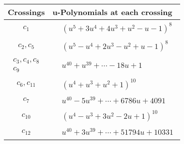 \documentclass[1p]{elsarticle_modified}
\theoremstyle{definition}
\begin{document}
\begin{tabular}{m{50pt}|m{274pt}}
Crossings & \hspace{64pt}u-Polynomials at each crossing \\
\hline $$\begin{aligned}c_{1}\end{aligned}$$&$\begin{aligned}
&(u^5+3 u^4+4 u^3+u^2- u-1)^8
\end{aligned}$\\
\hline $$\begin{aligned}c_{2},c_{5}\end{aligned}$$&$\begin{aligned}
&(u^5- u^4+2 u^3- u^2+u-1)^8
\end{aligned}$\\
\hline $$\begin{aligned}c_{3},c_{4},c_{8}\\c_{9}\end{aligned}$$&$\begin{aligned}
&u^{40}+u^{39}+\cdots-18 u+1
\end{aligned}$\\
\hline $$\begin{aligned}c_{6},c_{11}\end{aligned}$$&$\begin{aligned}
&(u^4+u^3+u^2+1)^{10}
\end{aligned}$\\
\hline $$\begin{aligned}c_{7}\end{aligned}$$&$\begin{aligned}
&u^{40}-5 u^{39}+\cdots+6786 u+4091
\end{aligned}$\\
\hline $$\begin{aligned}c_{10}\end{aligned}$$&$\begin{aligned}
&(u^4- u^3+3 u^2-2 u+1)^{10}
\end{aligned}$\\
\hline $$\begin{aligned}c_{12}\end{aligned}$$&$\begin{aligned}
&u^{40}+3 u^{39}+\cdots+51794 u+10331
\end{aligned}$\\
\hline
\end{tabular}\\~\\
\newpage\renewcommand{\arraystretch}{1}
\end{document}
